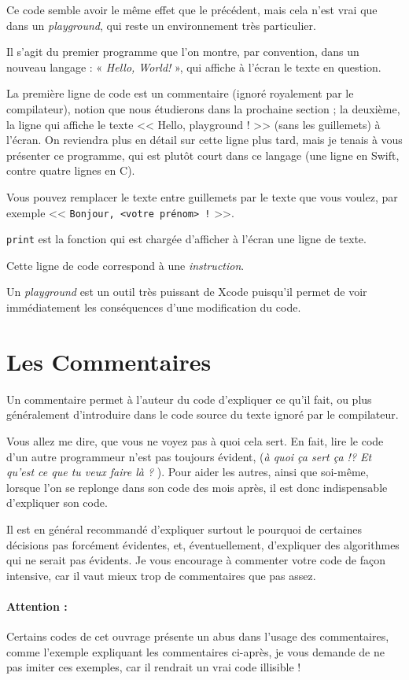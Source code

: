 Ce code semble avoir le même effet que le précédent,
mais cela n'est vrai que dans un \emph{playground},
qui reste un environnement très particulier.

Il s’agit du premier programme que l’on montre,
par convention, dans un nouveau langage :
« \emph{Hello, World!} », qui affiche à l’écran le texte en question.

La première ligne de code est un commentaire
(ignoré royalement par le compilateur),
notion que nous étudierons dans la prochaine section ;
la deuxième, la ligne qui affiche le texte << Hello, playground ! >>
(sans les guillemets) à l’écran.
On reviendra plus en détail sur cette ligne plus tard,
mais je tenais à vous présenter ce programme,
qui est plutôt court dans ce langage
(une ligne en Swift, contre quatre lignes en C).

Vous pouvez remplacer le texte entre guillemets par le texte que vous voulez,
par exemple << \verb"Bonjour, <votre prénom> !" >>.

\texttt{print} est la fonction
qui est chargée d’afficher à l’écran une ligne de texte.

Cette ligne de code correspond à une \emph{instruction}.

Un \emph{playground} est un outil très puissant de Xcode
puisqu’il permet de voir immédiatement
les conséquences d’une modification du code.
\section{Les Commentaires}
Un commentaire permet à l’auteur du code d’expliquer ce qu’il fait,
ou plus généralement d’introduire dans le code source
du texte ignoré par le compilateur.

Vous allez me dire, que vous ne voyez pas à quoi cela sert.
En fait, lire le code d’un autre programmeur n’est pas toujours évident,
(\og \emph{à quoi ça sert ça !? Et qu’est ce que tu veux faire là ?} \fg{}).
Pour aider les autres, ainsi que soi-même,
lorsque l'on se replonge dans son code des mois après,
il est donc indispensable d’expliquer son code.

Il est en général recommandé d'expliquer surtout
le pourquoi de certaines décisions pas forcément évidentes,
et, éventuellement, d'expliquer des algorithmes qui ne serait pas évidents.
Je vous encourage à commenter votre code de façon intensive,
car il vaut mieux trop de commentaires que pas assez.

\paragraph{Attention :}
Certains codes de cet ouvrage présente un abus dans l'usage des commentaires,
comme l'exemple expliquant les commentaires ci-après,
je vous demande de ne pas imiter ces exemples,
car il rendrait un vrai code illisible !

